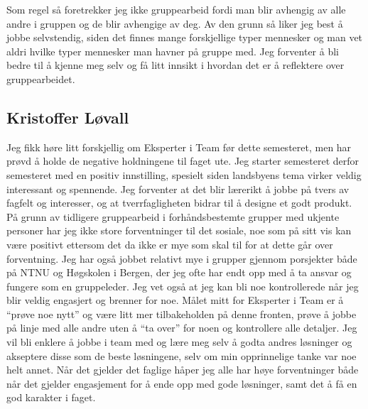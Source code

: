 Som regel så foretrekker jeg ikke gruppearbeid fordi man blir avhengig av alle andre i gruppen og de blir avhengige av deg. 
Av den grunn så liker jeg best å jobbe selvstendig, siden det finnes mange forskjellige typer mennesker og man vet aldri 
hvilke typer mennesker man havner på gruppe med. Jeg forventer å bli bedre til å kjenne meg selv og få litt innsikt i 
hvordan det er å reflektere over gruppearbeidet.

\subsection*{Kristoffer Løvall}
Jeg fikk høre litt forskjellig om Eksperter i Team før dette semesteret, men har 
prøvd å holde de negative holdningene til faget ute. Jeg starter semesteret 
derfor semesteret med en positiv innstilling, spesielt siden landsbyens tema 
virker veldig interessant og spennende. Jeg forventer at det blir lærerikt å 
jobbe på tvers av fagfelt og interesser, og at tverrfagligheten bidrar til å 
designe et godt produkt. På grunn av tidligere gruppearbeid i forhåndsbestemte 
grupper med ukjente personer har jeg ikke store forventninger til det sosiale, 
noe som på sitt vis kan være positivt ettersom det da ikke er mye som skal til 
for at dette går over forventning. Jeg har også jobbet relativt mye i grupper 
gjennom porsjekter både på NTNU og Høgskolen i Bergen, der jeg ofte har endt opp 
med å ta ansvar og fungere som en gruppeleder. Jeg vet også at jeg kan bli noe 
kontrollerede når jeg blir veldig engasjert og brenner for noe.  Målet mitt for 
Eksperter i Team er å ``prøve noe nytt'' og være litt mer tilbakeholden på denne 
fronten, prøve å jobbe på linje med alle andre uten å ``ta over'' for noen og 
kontrollere alle detaljer. Jeg vil bli enklere å jobbe i team med og lære meg 
selv å godta andres løsninger og akseptere disse som de beste løsningene, selv om 
min opprinnelige tanke var noe helt annet. Når det gjelder det faglige håper jeg 
alle har høye forventninger både når det gjelder engasjement for å ende opp med 
gode løsninger, samt det å få en god karakter i faget.

